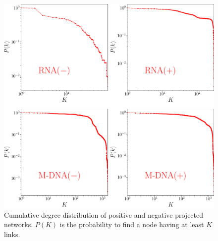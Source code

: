 \documentclass[10pt,a4paper]{article}
\begin{document}
\begin{figure}[h!]
\centering
\includegraphics[scale=0.3]{degree-distr.pdf}
\caption{\label{fig:degreedistr}Cumulative degree distribution of positive and negative projected networks. $P(K)$ is the probability to find a node having at least $K$ links.}
\end{figure}
\end{document}
